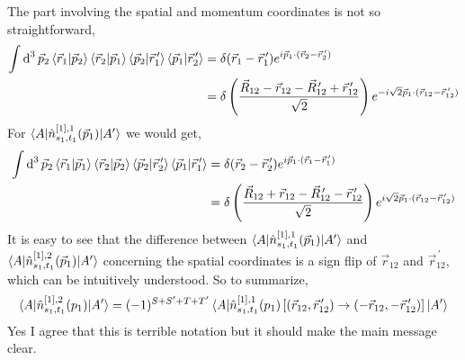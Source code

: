 \documentclass[10pt]{article}
\begin{document}
The part involving the spatial and momentum coordinates is not so straightforward,
\begin{align*}
	\int \text{d}^{3}\,\vec{p}_{2} \braket{ \vec{r}_{1} | \vec{p}_{2} } \braket{ \vec{r}_{2} | \vec{p}_{1}} \braket{ \vec{p}_2 | \vec{r}_{1}^{\,\prime}} \braket{ \vec{p}_{1} | \vec{r}_{2}^{\,\prime}} &= \delta( \vec{r}_{1} - \vec{r}_{1}^{\,\prime}) e^{i \vec{p}_{1} \cdot ( \vec{r}_{2} - \vec{r}_{2}^{\,\prime})} \\
	&= \delta \left( \frac{ \vec{R}_{12} - \vec{r}_{12} - \vec{R}_{12}^{\,\prime} + \vec{r}_{12}^{\,\prime}}{\sqrt{2}} \right) e^{ - i \sqrt{2} \vec{p}_{1} \cdot ( \vec{r}_{12} - \vec{r}_{12}^{\, \prime})}
\end{align*}
For $\braket{ A | \hat{n}^{[1],1}_{s_1,t_1}(\vec{p}_1) | A'} $ we would get,
\begin{align*}
	\int \text{d}^{3}\,\vec{p}_{2} \braket{ \vec{r}_{1} | \vec{p}_{1} } \braket{ \vec{r}_{2} | \vec{p}_{2}} \braket{ \vec{p}_2 | \vec{r}_{2}^{\,\prime}} \braket{ \vec{p}_{1} | \vec{r}_{1}^{\,\prime}} &= \delta( \vec{r}_{2} - \vec{r}_{2}^{\,\prime}) e^{i \vec{p}_{1} \cdot ( \vec{r}_{1} - \vec{r}_{1}^{\,\prime})} \\
	&= \delta \left( \frac{ \vec{R}_{12} + \vec{r}_{12} - \vec{R}_{12}^{\,\prime} - \vec{r}_{12}^{\,\prime}}{\sqrt{2}} \right) e^{ i \sqrt{2} \vec{p}_{1} \cdot ( \vec{r}_{12} - \vec{r}_{12}^{\, \prime})}
\end{align*}
It is easy to see that the difference between $\braket{ A | \hat{n}^{[1],1}_{s_1,t_1}(\vec{p}_1) | A'} $ and $\braket{ A | \hat{n}^{[1],2}_{s_1,t_1}(\vec{p}_1) | A'} $ concerning the spatial coordinates is a sign flip of $\vec{r}_{12}$ and $\vec{r}_{12}^{\, \prime}$, which can be intuitively understood. So to summarize,
\begin{align}
	\braket{ A | \hat{n}^{[1],2}_{s_1,t_1}(p_1) | A'} = (-1)^{S+S'+T+T'} \braket{ A | \hat{n}^{[1],1}_{s_1,t_1}(p_1) \left[ ( \vec{r}_{12}, \vec{r}_{12}^{\, \prime} ) \rightarrow ( - \vec{r}_{12}, - \vec{r}_{12}^{\, \prime} ) \right] | A'} 
	\label{eq:ob_mom_12_relation}
\end{align}
Yes I agree that this is terrible notation but it should make the main message clear.
\end{document}
